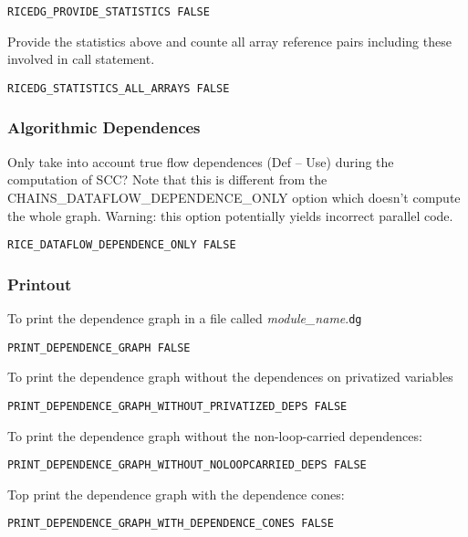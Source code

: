 \begin{verbatim}
RICEDG_PROVIDE_STATISTICS FALSE
\end{verbatim}

Provide the statistics above and counte all array reference pairs
including these involved in call statement.

\begin{verbatim}
RICEDG_STATISTICS_ALL_ARRAYS FALSE
\end{verbatim}

\subsubsection{Algorithmic Dependences}

Only take into account true flow dependences (Def -- Use) during the
computation of SCC?  Note that this is different from the
CHAINS\_DATAFLOW\_DEPENDENCE\_ONLY option which doesn't compute the
whole graph.  Warning: this option potentially yields incorrect parallel
code.

\begin{verbatim}
RICE_DATAFLOW_DEPENDENCE_ONLY FALSE
\end{verbatim}

\subsubsection{Printout}

To print the dependence graph in a file called {\em module\_name}.{\tt dg}

\begin{verbatim}
PRINT_DEPENDENCE_GRAPH FALSE
\end{verbatim}

To print the dependence graph without the dependences on privatized
variables 

\begin{verbatim}
PRINT_DEPENDENCE_GRAPH_WITHOUT_PRIVATIZED_DEPS FALSE
\end{verbatim}

To print the dependence graph without the non-loop-carried dependences:
 
\begin{verbatim}
PRINT_DEPENDENCE_GRAPH_WITHOUT_NOLOOPCARRIED_DEPS FALSE
\end{verbatim}

Top print the dependence graph with the dependence cones:

\begin{verbatim}
PRINT_DEPENDENCE_GRAPH_WITH_DEPENDENCE_CONES FALSE
\end{verbatim}

